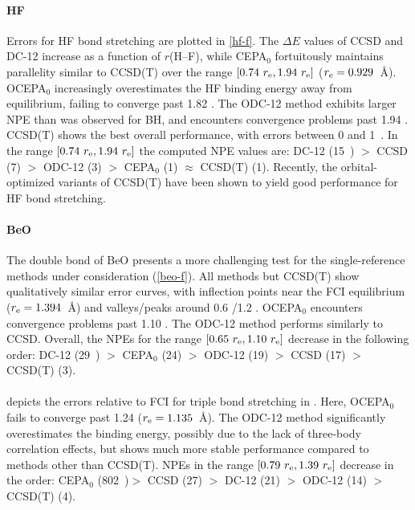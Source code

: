 \paragraph{HF}
Errors for HF bond stretching are plotted in \cref{hf-f}.
The $\Delta E$ values of CCSD and DC-12 increase as a function of $r$(H--F),
while CEPA$_0$ fortuitously maintains parallelity similar to CCSD(T) over the
range $[0.74\ \re, 1.94\ \re]$ ($r_\mathrm{e} = 0.929$~\AA).
OCEPA$_0$ increasingly overestimates the HF binding energy away from
equilibrium, failing to converge past 1.82 \re.
The ODC-12 method exhibits larger NPE than was observed for BH, and encounters
convergence problems past 1.94 \re.
CCSD(T) shows the best overall performance, with errors between 0 and
1~\mhartree.
In the range $[0.74\ \re, 1.94\ \re]$ the computed NPE values are:
DC-12    (15~\mhartree) $>$
CCSD     (7) $>$
ODC-12   (3) $>$
CEPA$_0$ (1) $\approx$
CCSD(T)  (1).
Recently, the orbital-optimized variants of CCSD(T) have been shown to yield
good performance for HF bond stretching.\cite{Bozkaya:2012p204114}

\paragraph{BeO}
The double bond of BeO presents a more challenging test for the single-reference
methods under consideration (\cref{beo-f}).
All methods but CCSD(T) show qualitatively similar error curves, with inflection
points near the FCI equilibrium ($r_\mathrm{e}=1.394$~\AA) and valleys/peaks around 0.6
\re/1.2 \re.
OCEPA$_0$ encounters convergence problems past 1.10 \re.
The ODC-12 method performs similarly to CCSD\@.
Overall, the NPEs for the range $[0.65\ r_\mathrm{e}, 1.10\ r_\mathrm{e}]$ decrease in the
following order:
DC-12    (29~\mhartree) $>$ 
CEPA$_0$ (24) $>$
ODC-12   (19) $>$
CCSD     (17) $>$
CCSD(T)  (3).

\paragraph{}
 depicts the errors relative to FCI for triple bond stretching in
.
Here, OCEPA$_0$ fails to converge past 1.24 \re ($r_\mathrm{e} = 1.135$~\AA).
The ODC-12 method significantly overestimates the binding energy, possibly due
to the lack of three-body correlation effects, but shows much more stable
performance compared to methods other than CCSD(T).
NPEs in the range $[0.79\ \re, 1.39\ \re]$ decrease in the order:
CEPA$_0$ (802~\mhartree)\footnotemark $>$
CCSD     (27) $>$
DC-12    (21) $>$
ODC-12   (14) $>$
CCSD(T)  (4).


